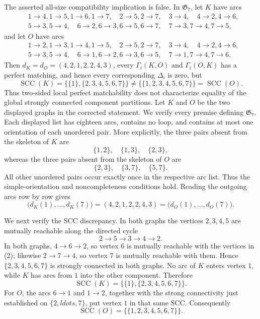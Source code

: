 The asserted all-size compatibility implication is false.  In \(\mathfrak G_7\), let \(K\) have arcs
\[
\begin{split}
&1\to4,1\to5,1\to6,1\to7,\quad
2\to5,2\to7,\quad 3\to4,\quad 4\to2,4\to6,\\
&5\to3,5\to4,\quad
6\to2,6\to3,6\to5,6\to7,\quad
7\to3,7\to4,7\to5,
\end{split}
\]
and let \(O\) have arcs
\[
\begin{split}
&1\to2,1\to3,1\to4,1\to5,\quad
2\to5,2\to7,\quad 3\to4,\quad 4\to2,4\to6,\\
&5\to3,5\to4,\quad
6\to1,6\to2,6\to3,6\to5,\quad
7\to1,7\to4,7\to6.
\end{split}
\]
Then \(d_K=d_O=(4,2,1,2,2,4,3)\), every \(\Gamma_i(K,O)\) and \(\Gamma_i(O,K)\) has a perfect matching, and hence every corresponding \(\Delta_i\) is zero, but
\[
\operatorname{SCC}(K)=\bigl\{\{1\},\{2,3,4,5,6,7\}\bigr\}
\ne
\bigl\{\{1,2,3,4,5,6,7\}\bigr\}=\operatorname{SCC}(O).
\]
Thus two-sided local perfect matchability does not characterize equality of the global strongly connected component partitions.
Let \(K\) and \(O\) be the two displayed graphs in the corrected statement.  We verify every premise defining \(\mathfrak G_7\).  Each displayed list has eighteen arcs, contains no loop, and contains at most one orientation of each unordered pair.  More explicitly, the three pairs absent from the skeleton of \(K\) are
\[
\{1,2\},\quad \{1,3\},\quad \{2,3\},
\]
whereas the three pairs absent from the skeleton of \(O\) are
\[
\{2,3\},\quad \{3,7\},\quad \{5,7\}.
\]
All other unordered pairs occur exactly once in the respective arc list.  Thus the simple-orientation and noncompleteness conditions hold.  Reading the outgoing arcs row by row gives
\[
\bigl(d_K(1),\ldots,d_K(7)\bigr)
=(4,2,1,2,2,4,3)
=\bigl(d_O(1),\ldots,d_O(7)\bigr).
\tag{1}
\]

We next verify the SCC discrepancy.  In both graphs the vertices \(2,3,4,5\) are mutually reachable along the directed cycle
\[
2\to5\to3\to4\to2.
\tag{2}
\]
In both graphs, \(4\to6\to2\), so vertex \(6\) is mutually reachable with the vertices in (2); likewise \(2\to7\to4\), so vertex \(7\) is mutually reachable with them.  Hence \(\{2,3,4,5,6,7\}\) is strongly connected in both graphs.  No arc of \(K\) enters vertex \(1\), while \(K\) has arcs from \(1\) into the other component.  Therefore
\[
\operatorname{SCC}(K)=\bigl\{\{1\},\{2,3,4,5,6,7\}\bigr\}.
\tag{3}
\]
For \(O\), the arcs \(6\to1\) and \(1\to2\), together with the strong connectivity just established on \(\{2,ldots,7\}\), put vertex \(1\) in that same SCC.  Consequently
\[
\operatorname{SCC}(O)=\bigl\{\{1,2,3,4,5,6,7\}\bigr\}.
\tag{4}
\]

